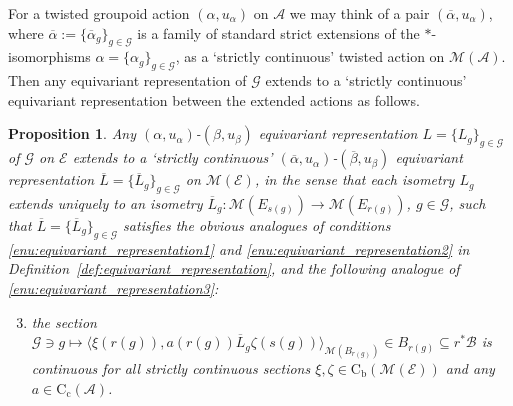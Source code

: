 \documentclass[11 pt, leqno]{amsart}
\numberwithin{equation}{section}
\theoremstyle{plain}
\newtheorem {prop}[thm] {Proposition}
\theoremstyle{definition}
\newcommand*{\contc}{\mathrm{C_c}}%
\newcommand*{\contb}{\mathrm{C_b}}%
\newcommand{\B}{\mathcal B}
\newcommand{\M}{\mathcal M}
\newcommand{\G}{\mathcal G} %
\newcommand{\EE}{\mathcal E}
\newcommand{\A}{\mathcal A}
\begin{document}
For a twisted groupoid action $(\alpha, u_{\alpha})$ on $\A$ we may think of a pair $(\overline{\alpha}, u_{\alpha})$, where $\overline{\alpha}:=\{\overline{\alpha}_{g}\}_{g\in \G}$ is a family of standard strict extensions of the $*$-isomorphisms $\alpha=\{\alpha_{g}\}_{g\in \G}$, as a `strictly continuous' twisted action on $\M(\A)$. 
Then any equivariant representation of $\G$ extends to a `strictly continuous' equivariant representation between the extended actions as follows. 

\begin{prop}\label{prop:strict_extension_of_groupoid_action}
Any $(\alpha, u_{\alpha})$-$(\beta,u_{\beta})$ equivariant representation $L=\{L_g\}_{g\in \G}$ of $\G$ on $\EE$ extends to a `strictly continuous' $(\overline{\alpha}, u_{\alpha})$-$(\overline{\beta}, u_{\beta})$ equivariant representation $\overline{L}=\{\overline{L}_g\}_{g\in \G}$ on  $\M(\EE)$, in the sense that each isometry $L_g$ extends uniquely to an isometry $ \overline{L}_{g} : \M(E_{s(g)}) \to \M(E_{r(g)})$, $g\in \G$, such that $\overline{L} = \{ \overline{L}_g \}_{g\in \G}$ satisfies the obvious analogues of conditions \ref{enu:equivariant_representation1} and \ref{enu:equivariant_representation2} in Definition~\ref{def:equivariant_representation}, and the following analogue of \ref{enu:equivariant_representation3}:
\begin{enumerate}[label={(\arabic*')}]  \setcounter{enumi}{2}
    \item\label{enu:equivariant_representation3'} the section $\G\ni g \longmapsto  \langle  \xi(r(g)),a(r(g)) \overline{L}_g \zeta(s(g))\rangle_{\M(B_{r(g)})}\in B_{r(g)}\subseteq r^*\B$ is continuous for all strictly continuous sections  $\xi, \zeta \in \contb(\M(\EE))$ and any $a\in \contc(\A)$.
\end{enumerate}
\end{prop}
\end{document}
